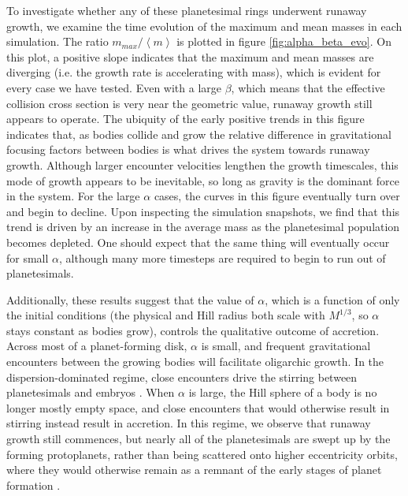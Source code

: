 \documentclass[twocolumn]{aastex63}
\begin{document}
To investigate whether any of these planetesimal rings underwent
runaway growth, we examine the time evolution of the maximum and mean
masses in each simulation. The ratio $m_{max}/\left< m \right>$ is plotted
in figure \ref{fig:alpha_beta_evo}. On this plot, a positive slope
indicates that the maximum and mean masses are diverging (i.e.
the growth rate is accelerating with mass), which is
evident for every case we have tested. Even with a large
$\beta$, which means that the effective collision cross section is
very near the geometric value, runaway growth still appears to
operate. The ubiquity of the early positive trends in this figure indicates
that, as bodies collide and grow the
relative difference in gravitational focusing factors between bodies
is what drives the system towards runaway
growth. Although larger encounter velocities lengthen the growth
timescales, this mode of growth appears to be inevitable, so long as
gravity is the dominant force in the system. For the large $\alpha$
cases, the curves in this figure eventually turn over and begin to decline.
Upon inspecting the simulation snapshots, we find that this trend is
driven by an increase in the average mass as the planetesimal population
becomes depleted. One should expect that the same thing will eventually
occur for small $\alpha$, although many more timesteps are required to
begin to run out of planetesimals.

Additionally, these results suggest that the value of $\alpha$, which is a function of only the initial conditions (the physical and 
Hill radius both scale with $M^{1/3}$, so $\alpha$ stays constant as bodies grow), controls the qualitative outcome of accretion. 
Across most of a planet-forming disk, $\alpha$ is small, and frequent gravitational encounters between the growing bodies will 
facilitate oligarchic growth. In the dispersion-dominated regime, close encounters drive the stirring between planetesimals and 
embryos \citep{weidenschilling89, ida90}. When $\alpha$ is large, the Hill sphere of a body is no longer mostly empty space, 
and close encounters that would otherwise result in stirring instead result in accretion. In this regime, we observe that runaway 
growth still commences, but nearly all of the planetesimals are swept up by the forming protoplanets, rather than being scattered 
onto higher eccentricity orbits, where they would otherwise remain as a remnant of the early stages of planet formation 
\citep{kokubo98, kokubo00}.

\end{document}

